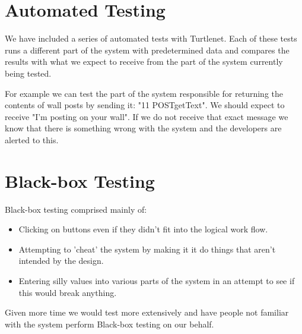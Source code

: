 \section{Automated Testing}
We have included a series of automated tests with Turtlenet. Each of these tests runs a different part of the system 
with predetermined data and compares the results with what we expect to receive from the part of the system currently 
being tested.

For example we can test the part of the system responsible for returning the contents of wall posts by sending it:
"11 POSTgetText". We should expect to receive "I'm posting on your wall". If we do not receive that exact message we
know that there is something wrong with the system and the developers are alerted to this.

\section{Black-box Testing}
Black-box testing comprised mainly of:

\begin{itemize}
    \item Clicking on buttons even if they didn't fit into the logical work flow.
    \item Attempting to 'cheat' the system by making it it do things that aren't intended by the design.
    \item Entering silly values into various parts of the system in an attempt to see if this would break anything.
\end{itemize}

Given more time we would test more extensively and have people not familiar with the system perform Black-box testing on
our behalf.
